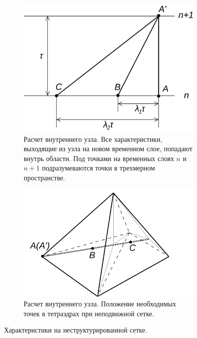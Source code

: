 \begin{figure}[h]
\centering
\begin{subfigure}[b]{0.5\textwidth}
\centering
\includegraphics[width=\textwidth]{png/characteristics-2d-triangles-inner-1.png}
\caption{Расчет внутреннего узла. Все характеристики, выходящие из узла на новом временном слое, попадают внутрь области. Под точками на временных слоях $n$ и $n+1$ подразумеваются точки в трехмерном пространстве.}
\end{subfigure}
\begin{subfigure}[b]{0.5\textwidth}
\centering
\includegraphics[width=\textwidth]{png/characteristics-2d-triangles-inner-2.png}
\caption{Расчет внутреннего узла. Положение необходимых точек в тетраэдрах при неподвижной сетке.}
\end{subfigure}
\caption{Характеристики на неструктурированной сетке.}
\label{pic:gcm_3d}
\end{figure}

